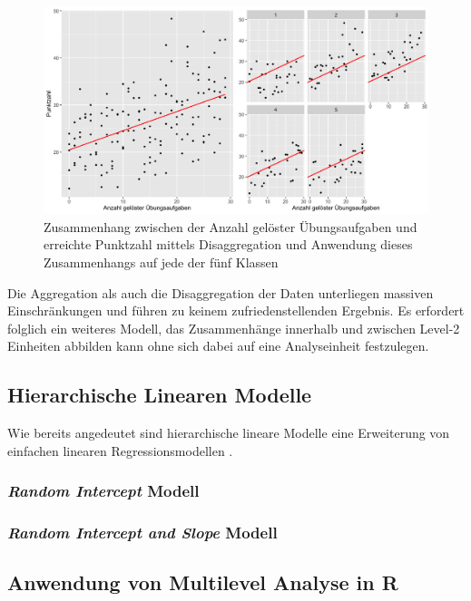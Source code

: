 \documentclass[12pt]{article}\usepackage[]{graphicx}\usepackage[]{color}
\numberwithin{equation}{section}
\begin{document}
\begin{figure}[t!]
\centering
\includegraphics[width = \textwidth]{disaggregation_combined}
\caption{Zusammenhang zwischen der Anzahl gelöster Übungsaufgaben und erreichte Punktzahl mittels Disaggregation und Anwendung dieses Zusammenhangs auf jede der fünf Klassen}
\label{fig:disaggregation}
\end{figure}

Die Aggregation als auch die Disaggregation der Daten unterliegen massiven Einschränkungen und führen zu keinem zufriedenstellenden Ergebnis. Es erfordert folglich ein weiteres Modell, das Zusammenhänge innerhalb und zwischen Level-2 Einheiten abbilden kann ohne sich dabei auf eine Analyseinheit festzulegen.


\subsection{Hierarchische Linearen Modelle}
Wie bereits angedeutet sind hierarchische lineare Modelle eine Erweiterung von einfachen linearen Regressionsmodellen \citep{SnijdersTomA.B2012Ma:a, twisk_2006}. 












\subsubsection{\textit{Random Intercept} Modell}
\subsubsection{\textit{Random Intercept and Slope} Modell}

\subsection{Anwendung von Multilevel Analyse in R}
\end{document}
